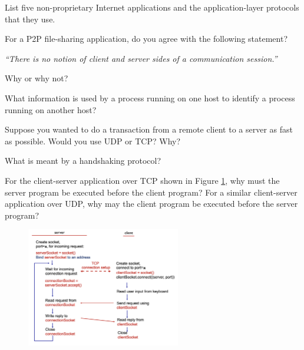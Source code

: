 
\question List five non-proprietary Internet applications and the application-layer protocols that they use.

\question For a P2P file-sharing application, do you agree with the following statement?
\begin{center}
    \emph{``There is no notion of client and server sides of a communication session.''}
\end{center}
Why or why not?

\question What information is used by a process running on one host to identify a process running on another host?

\question Suppose you wanted to do a transaction from a remote client to a server as fast as possible. Would you use UDP or TCP? Why?

\question What is meant by a handshaking protocol?

\question For the client-server application over TCP shown in Figure \ref{fig:prac-2-1}, why must the server program be executed before the client program? 
For a similar client-server application over UDP, why may the client program be executed before the server program?

\begin{figure}
    \centering
    \includegraphics[width=0.6\textwidth]{images/prac-2-1.png}
    \caption{}
    \label{fig:prac-2-1}
\end{figure}
